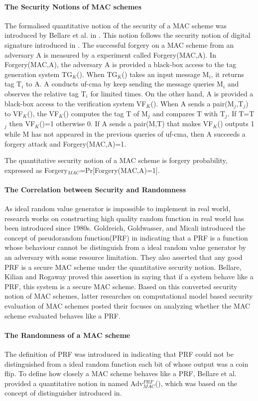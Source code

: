 \documentclass{article}
\begin{document}
\paragraph{The Security Notions of MAC schemes}
The formalised quantitative notion of the security of a MAC scheme was introduced by Bellare et al. in \cite{cbc1994}. This notion follows the security notion of digital signature introduced in \cite{signature}. The successful forgery on a MAC scheme from an adversary A is measured by a experiment called Forgery(MAC,A). In Forgery(MAC,A),  
the adversary A is provided a black-box access to the tag generation system TG$_K$(). When TG$_K$() takes an input message M$_i$, it returns tag T$_i$ to A. A conducts uf-cma by keep sending the message queries M$_i$ and observes the relative tag T$_i$ for limited times. On the other hand, A is provided a black-box access to the verification system VF$_K$(). When A sends a pair(M$_j$,T$_j$) to VF$_K$(), the VF$_K$() computes the tag T of M$_j$ and compares T with T$_j$. If T=T$_j$ then VF$_K$()=1 otherwise 0. If A sends a pair(M,T) that makes VF$_K$() outputs 1 while M has not appeared in the previous queries of uf-cma, then A succeeds a forgery attack and Forgery(MAC,A)=1.

The quantitative security notion of a MAC scheme is forgery probability, expressed as Forgery$_{MAC}$=Pr[Forgery(MAC,A)=1].
\paragraph{The Correlation between Security and Randomness}
As ideal random value generator is impossible to implement in real world, research works on constructing high quality random function in real world has been introduced since 1980s. Goldreich, Goldwasser, and Micali introduced the concept of pseudorandom function(PRF) in \cite{prf} indicating that a PRF is a function whose behaviour cannot be distinguish from a ideal random value generator by an adversary with some resource limitation. They also asserted that any good
PRF is a secure MAC scheme under the quantitative
security notion. Bellare, Kilian and Rogaway proved this assertion in
\cite{cbc1994} saying that if a system behave like a PRF, this
system is a secure MAC scheme. Based on this converted security notion of MAC schemes, latter researches
on computational model based security evaluation of MAC schemes posted their focuses on analyzing whether the MAC scheme evaluated behaves like a PRF.
\paragraph{The Randomness of a MAC scheme}
The definition of PRF was introduced in \cite{prf} indicating that PRF could not be distinguished from a ideal random function each bit of whose output was a coin flip. To define how closely a MAC scheme behaves like a PRF, Bellare et al. provided a quantitative notion in \cite{cbc1994} named Adv$^{PRF}_{MAC}$(), which was based on the concept of distinguisher introduced in\cite{prf}. 
\end{document}
